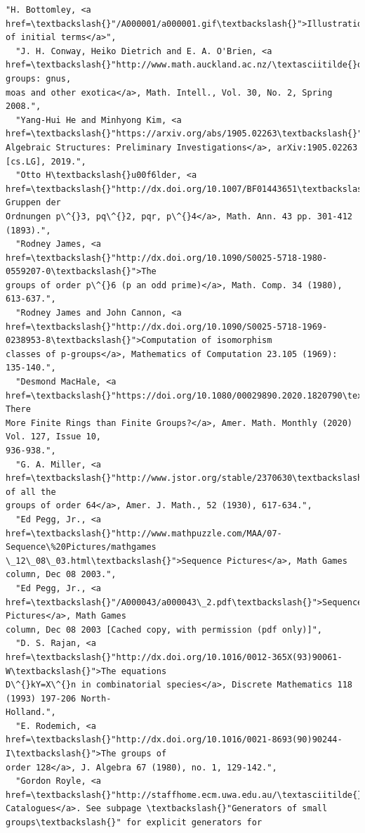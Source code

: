 \documentclass[11pt]{article}
\begin{document}
\begin{Verbatim}[commandchars=\\\{\}]
  "H. Bottomley, <a href=\textbackslash{}"/A000001/a000001.gif\textbackslash{}">Illustration of initial terms</a>",
  "J. H. Conway, Heiko Dietrich and E. A. O'Brien, <a
href=\textbackslash{}"http://www.math.auckland.ac.nz/\textasciitilde{}obrien/research/gnu.pdf\textbackslash{}">Counting groups: gnus,
moas and other exotica</a>, Math. Intell., Vol. 30, No. 2, Spring 2008.",
  "Yang-Hui He and Minhyong Kim, <a href=\textbackslash{}"https://arxiv.org/abs/1905.02263\textbackslash{}">Learning
Algebraic Structures: Preliminary Investigations</a>, arXiv:1905.02263 [cs.LG], 2019.",
  "Otto H\textbackslash{}u00f6lder, <a href=\textbackslash{}"http://dx.doi.org/10.1007/BF01443651\textbackslash{}">Die Gruppen der
Ordnungen p\^{}3, pq\^{}2, pqr, p\^{}4</a>, Math. Ann. 43 pp. 301-412 (1893).",
  "Rodney James, <a href=\textbackslash{}"http://dx.doi.org/10.1090/S0025-5718-1980-0559207-0\textbackslash{}">The
groups of order p\^{}6 (p an odd prime)</a>, Math. Comp. 34 (1980), 613-637.",
  "Rodney James and John Cannon, <a
href=\textbackslash{}"http://dx.doi.org/10.1090/S0025-5718-1969-0238953-8\textbackslash{}">Computation of isomorphism
classes of p-groups</a>, Mathematics of Computation 23.105 (1969): 135-140.",
  "Desmond MacHale, <a href=\textbackslash{}"https://doi.org/10.1080/00029890.2020.1820790\textbackslash{}">Are There
More Finite Rings than Finite Groups?</a>, Amer. Math. Monthly (2020) Vol. 127, Issue 10,
936-938.",
  "G. A. Miller, <a href=\textbackslash{}"http://www.jstor.org/stable/2370630\textbackslash{}">Determination of all the
groups of order 64</a>, Amer. J. Math., 52 (1930), 617-634.",
  "Ed Pegg, Jr., <a href=\textbackslash{}"http://www.mathpuzzle.com/MAA/07-Sequence\%20Pictures/mathgames
\_12\_08\_03.html\textbackslash{}">Sequence Pictures</a>, Math Games column, Dec 08 2003.",
  "Ed Pegg, Jr., <a href=\textbackslash{}"/A000043/a000043\_2.pdf\textbackslash{}">Sequence Pictures</a>, Math Games
column, Dec 08 2003 [Cached copy, with permission (pdf only)]",
  "D. S. Rajan, <a href=\textbackslash{}"http://dx.doi.org/10.1016/0012-365X(93)90061-W\textbackslash{}">The equations
D\^{}kY=X\^{}n in combinatorial species</a>, Discrete Mathematics 118 (1993) 197-206 North-
Holland.",
  "E. Rodemich, <a href=\textbackslash{}"http://dx.doi.org/10.1016/0021-8693(90)90244-I\textbackslash{}">The groups of
order 128</a>, J. Algebra 67 (1980), no. 1, 129-142.",
  "Gordon Royle, <a
href=\textbackslash{}"http://staffhome.ecm.uwa.edu.au/\textasciitilde{}00013890/data.html\textbackslash{}">Combinatorial
Catalogues</a>. See subpage \textbackslash{}"Generators of small groups\textbackslash{}" for explicit generators for

\end{Verbatim}
\end{document}
